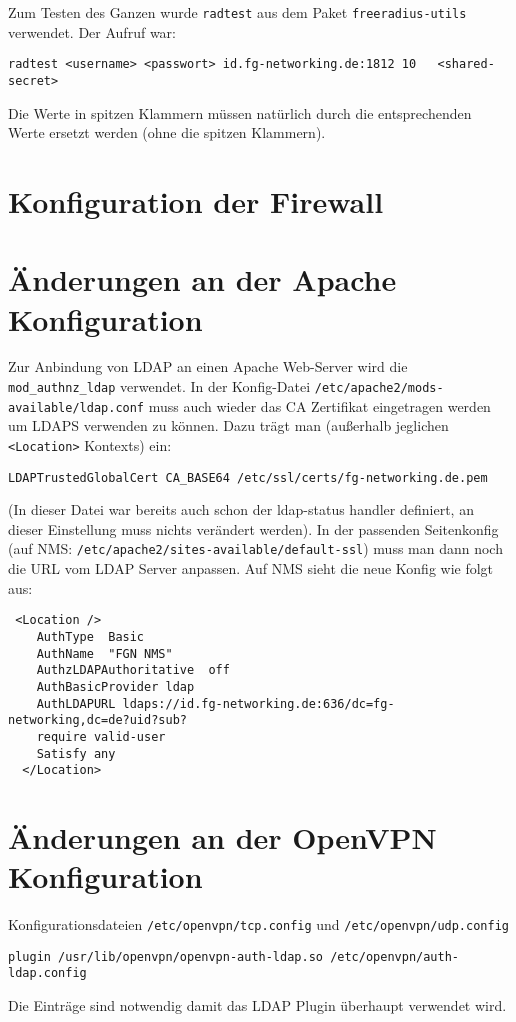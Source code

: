 \documentclass[11pt,a4paper,titlepage=firstiscover,headsepline]{scrartcl} %
\begin{document}
Zum Testen des Ganzen wurde \texttt{radtest} aus dem Paket \texttt{freeradius-utils} verwendet. Der Aufruf war:
\begin{lstlisting}
radtest <username> <passwort> id.fg-networking.de:1812 10	<shared-secret>
\end{lstlisting}
Die Werte in spitzen Klammern müssen natürlich durch die entsprechenden Werte ersetzt werden (ohne die spitzen Klammern).


\newpage
\section{Konfiguration der Firewall}\label{sec:Firewall-Konfig}

\newpage
\section{Änderungen an der Apache Konfiguration}\label{sec:Apache-Konfig}
Zur Anbindung von LDAP an einen Apache Web-Server wird die \texttt{mod\_authnz\_ldap} verwendet. In der Konfig-Datei \texttt{/etc/apache2/mods-available/ldap.conf} muss auch wieder das CA Zertifikat eingetragen werden um LDAPS verwenden zu können. Dazu trägt man (außerhalb jeglichen \texttt{<Location>} Kontexts) ein:
\begin{lstlisting}
LDAPTrustedGlobalCert CA_BASE64 /etc/ssl/certs/fg-networking.de.pem
\end{lstlisting}
(In dieser Datei war bereits auch schon der ldap-status handler definiert, an dieser Einstellung muss nichts verändert werden). In der passenden Seitenkonfig (auf NMS: \texttt{/etc/apache2/sites-available/default-ssl}) muss man dann noch die URL vom LDAP Server anpassen. Auf NMS sieht die neue Konfig wie folgt aus:
\begin{lstlisting}
 <Location />
    AuthType  Basic
    AuthName  "FGN NMS"
    AuthzLDAPAuthoritative  off
    AuthBasicProvider ldap
    AuthLDAPURL ldaps://id.fg-networking.de:636/dc=fg-networking,dc=de?uid?sub?
    require valid-user
    Satisfy any
  </Location>
\end{lstlisting}

\newpage
\section{Änderungen an der OpenVPN Konfiguration}\label{sec:VPN-Konfig}
Konfigurationsdateien \texttt{/etc/openvpn/tcp.config} und \texttt{/etc/openvpn/udp.config}
\begin{lstlisting}
plugin /usr/lib/openvpn/openvpn-auth-ldap.so /etc/openvpn/auth-ldap.config
\end{lstlisting}
Die Einträge sind notwendig damit das LDAP Plugin überhaupt verwendet wird.
\end{document}
